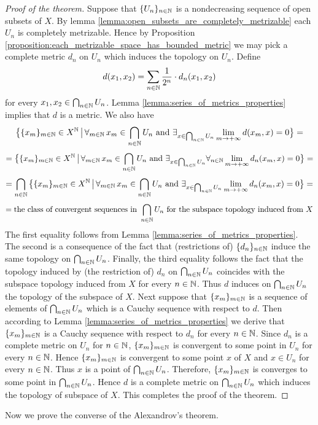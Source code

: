 \begin{proof}[Proof of the theorem]
Suppose that $\{U_n\}_{n\in {\mathbb N}}$ is a nondecreasing sequence of open subsets of $X$. By lemma \ref{lemma:open_subsets_are_completely_metrizable} each $U_n$ is completely metrizable. Hence by Proposition \ref{proposition:each_metrizable_space_has_bounded_metric} we may pick a complete metric $d_n$ on $U_n$ which induces the topology on $U_n$. Define
$$d(x_1,x_2) = \sum_{n\in {\mathbb N}}\frac{1}{2^n}\cdot d_n(x_1,x_2)$$
for every $x_1,x_2\in \bigcap_{n\in {\mathbb N}}U_n$. Lemma \ref{lemma:series_of_metrics_properties} implies that $d$ is a metric. We also have
$$\big\{\{x_m\}_{m\in {\mathbb N}}\in X^{{\mathbb N}}\,\big|\,\forall_{m\in {\mathbb N}}\,x_m\in \bigcap_{n\in {\mathbb N}}U_n\mbox{ and }\exists_{x\in \bigcap_{n\in {\mathbb N}}U_n}\lim_{m\rightarrow +\infty}d(x_m,x) = 0\big\} = $$
$$= \big\{\{x_m\}_{m\in {\mathbb N}}\in X^{{\mathbb N}}\,\big|\,\forall_{m\in {\mathbb N}}\,x_m\in \bigcap_{n\in {\mathbb N}}U_n\mbox{ and }\exists_{x\in \bigcap_{n\in {\mathbb N}}U_n}\forall_{n\in {\mathbb N}}\lim_{m\rightarrow +\infty}d_n(x_m,x) = 0\big\} = $$
$$= \bigcap_{n\in {\mathbb N}}\big\{\{x_m\}_{m\in {\mathbb N}}\in X^{{\mathbb N}}\,\big|\,\forall_{m\in {\mathbb N}}\,x_m\in \bigcap_{n\in {\mathbb N}}U_n\mbox{ and }\exists_{x\in \bigcap_{n\in {\mathbb N}}U_n}\lim_{m\rightarrow +\infty}d_n(x_m,x) = 0\big\} = $$
$$= \mbox{the class of convergent sequences in }\bigcap_{n\in {\mathbb N}}U_n\mbox{ for the subspace topology induced from $X$}$$
The first equality follows from Lemma \ref{lemma:series_of_metrics_properties}. The second is a consequence of the fact that (restrictions of) $\{d_n\}_{n\in {\mathbb N}}$ induce the same topology on $\bigcap_{n\in {\mathbb N}}U_n$. Finally, the third equality follows the fact that the topology induced by (the restriction of) $d_n$ on $\bigcap_{n\in {\mathbb N}}U_n$ coincides with the subspace topology induced from $X$ for every $n\in {\mathbb N}$. Thus $d$ induces on $\bigcap_{n\in {\mathbb N}}U_n$ the topology of the subspace of $X$. Next suppose that $\{x_m\}_{m\in {\mathbb N}}$ is a sequence of elements of $\bigcap_{n\in {\mathbb N}}U_n$ which is a Cauchy sequence with respect to $d$. Then according to Lemma \ref{lemma:series_of_metrics_properties} we derive that $\{x_m\}_{m\in {\mathbb N}}$ is a Cauchy sequence with respect to $d_n$ for every $n\in {\mathbb N}$. Since $d_n$ is a complete metric on $U_n$ for $n\in {\mathbb N}$, $\{x_m\}_{m\in {\mathbb N}}$ is convergent to some point in $U_n$ for every $n\in {\mathbb N}$. Hence $\{x_m\}_{m\in {\mathbb N}}$ is convergent to some point $x$ of $X$ and $x \in U_n$ for every $n\in {\mathbb N}$. Thus $x$ is a point of $\bigcap_{n\in {\mathbb N}}U_n$. Therefore, $\{x_m\}_{m\in {\mathbb N}}$ is converges to some point in $\bigcap_{n\in {\mathbb N}}U_n$. Hence $d$ is a complete metric on $\bigcap_{n\in {\mathbb N}}U_n$ which induces the topology of subspace of $X$. This completes the proof of the theorem.
\end{proof}
\noindent
Now we prove the converse of the Alexandrov's theorem.

